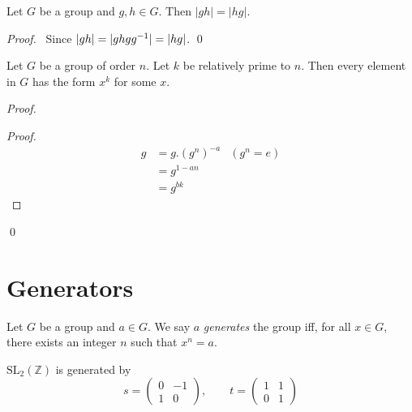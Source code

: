 \begin{prop}
    Let $G$ be a group and $g,h \in G$. Then $|gh| = |hg|$.
\end{prop}

\begin{proof}
    \pf\ Since $|gh| = |ghg{g}^{-1}| = |hg|$. \qed
\end{proof}

\begin{prop}
Let $G$ be a group of order $n$. Let $k$ be relatively prime to $n$. Then every element in $G$ has the form $x^k$ for some $x$.
\end{prop}

\begin{proof}
\begin{proof}
\pf
\begin{align*}
g & = g. (g^n)^{-a} & (g^n = e) \\
& = g^{1-an} \\
& = g^{bk}
\end{align*}
\end{proof}
\qed
\end{proof}

\section{Generators}

\begin{df}[Generator]
    Let $G$ be a group and $a \in G$. We say $a$ \emph{generates} the group iff, for all $x \in G$, there exists an integer $n$ such that $x^n = a$.
\end{df}

\begin{ex}
\label{ex:SL2Z}
$\mathrm{SL}_2(\mathbb{Z})$ is generated by
\[ s = \left( \begin{array}{cc}
0 & -1 \\ 1 & 0
\end{array} \right), \qquad
t = \left( \begin{array}{cc}
1 & 1 \\
0 & 1
\end{array} \right) \]
\end{ex}

